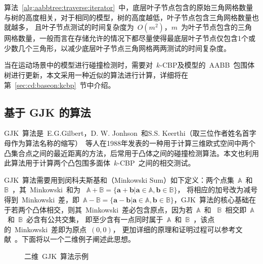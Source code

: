算法~\ref{alg:aabbtree:traverse:iterator}~中，底层叶子节点包含的原始三角网格数量与树的高度相关，对于相同的模型，树的高度越低，叶子节点包含三角网格数量也就越多，
且叶子节点测试的时间复杂度为~$O(m^2)$，$m$~为叶子节点包含的三角网格数量，一般而言在存储允许的情况下都尽量使得最底层叶子节点仅包含1个或少数几个三角形，以减少底层叶子节点三角网格两两测试的时间复杂度。

当在运动场景中的模型进行碰撞检测时，需要对~$k$-CBP及模型的~AABB~包围体树进行更新，本文采用一种近似的算法进行计算，详细将在第~\ref{sec:cd:baseon:kcbp}~节中介绍。

\subsection{基于 GJK 的算法}
\label{subsec:kcbp:cd:gjk}

GJK~算法是~E.G.Gilbert，D. W. Jonhson~和S.S. Keerthi（取三位作者姓名首字母作为算法名称的缩写）~等人在1988年发表的一种用于计算三维欧式空间中两个凸集合点之间的最近距离的方法\cite{gilbert1988fast}，后常用于凸体之间的碰撞检测算法\cite{bergen1999fast}。本文也利用此算法用于计算两个凸包围多面体~$k$-CBP~之间的相交测试。

GJK~算法需要用到闵科夫斯基和（Minkowski Sum）如下定义：两个点集~$\mathbb{A}$~和~$\mathbb{B}$~，其~Minkowski~和为
~$\mathbb{A} + \mathbb{B} = \{ \bm{a} + \bm{b} | \bm{a} \in \mathbb{A}, \bm{b} \in \mathbb{B}\}$， 
将相应的加号改为减号得到~Minkowski~差，即~$\mathbb{A} - \mathbb{B} = \{ \bm{a} - \bm{b} | \bm{a} \in \mathbb{A}, \bm{b} \in \mathbb{B}\} $，GJK~算法的核心基础在于若两个凸体相交，则其~Minkowski~差必包含原点，因为若~$\mathbb{A}$~和
~$\mathbb{B}$~相交即~$\mathbb{A}$~和~$\mathbb{B}$~必含有公共交集，
即至少含有一点同时属于~$\mathbb{A}$~和~$\mathbb{B}$~，该点的~Minkowski~差即为原点~$(0, 0)$，
更加详细的原理和证明过程可以参考文献~。下面将以一个二维例子阐述此思想。

\begin{figure}[htbp]
\centering
{} 
\caption{二维~GJK~算法示例}
\label{fig:gjk:example:2d}
\end{figure}

